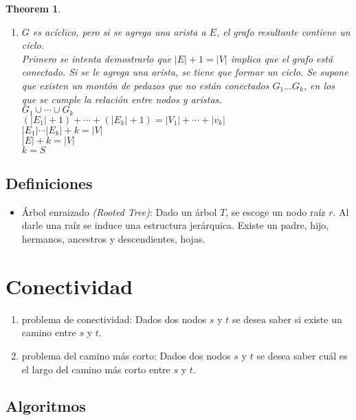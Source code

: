 \documentclass[12pt, fleqn]{article}
\newtheorem{theorem}{Theorem}[section]
\theoremstyle{definition}
\begin{document}
\begin{theorem}
\begin{enumerate}
                    \item $G$ es acíclico, pero si se agrega una arista a $E$, el grafo resultante contiene un ciclo. \\ \emph{Primero se intenta demostrarlo
                                que $|E| +1 = |V|$ implica que el grafo está conectado. Si se le agrega una arista, se tiene que formar un ciclo. Se supone que existen
                                un montón de pedazos que no están conectados $G_1 \dots G_k$, en los que se cumple la relación entre nodos y aristas.\\
                                $G_1 \cup \cdots \cup G_k$ \\ 
                                $(|E_1| +1) + \cdots + (|E_k| +1) = |V_1| +\cdots+ |v_k| $\\
                                $|E_1| \cdots |E_k| + k = |V|$ \\
                                $|E| + k = |V|$ \\
                                $k = S$  }
                \end{enumerate}
            \end{theorem}
        \subsection{Definiciones}
            \begin{itemize}
                \item Árbol enraizado \emph{(Rooted Tree)}: Dado un árbol $T$, se escoge un nodo raíz $r$. Al darle una raíz se induce una estructura jerárquica.
                    Existe un padre, hijo, hermanos, ancestros y descendientes, hojas.
            \end{itemize}
    \section{Conectividad}
        \begin{enumerate}
            \item problema de conectividad: Dados dos nodos $s$ y $t$ se desea saber si existe un camino entre $s$ y $t$.
            \item problema del camino más corto: Dados dos nodos $s$ y $t$ se desea saber cuál es el largo del camino más corto entre $s$ y $t$.
        \end{enumerate}

        \subsection{Algoritmos}
\end{document}
